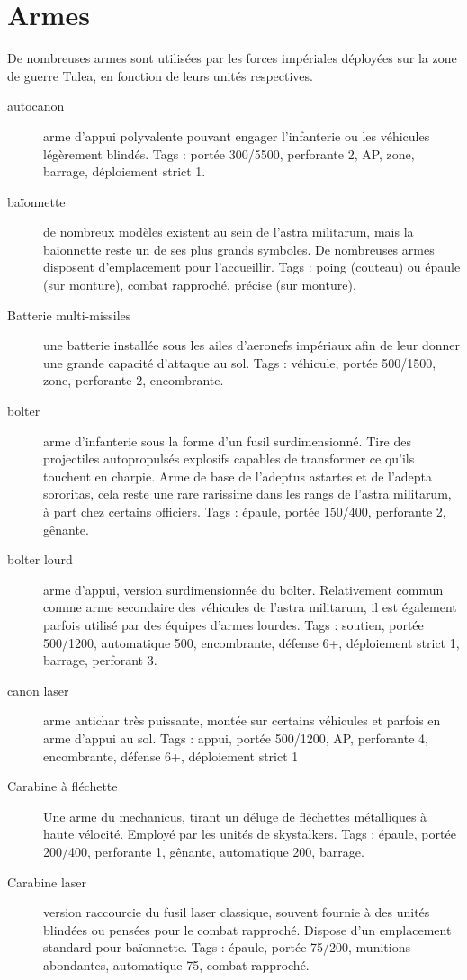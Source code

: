 \documentclass[10pt,a4paper]{article}
\begin{document}
\section{Armes}
De nombreuses armes sont utilisées par les forces impériales déployées sur la zone de guerre Tulea, en fonction de leurs unités respectives.
\begin{description}
\item[autocanon]arme d'appui polyvalente pouvant engager l'infanterie ou les véhicules légèrement blindés. Tags : portée 300/5500, perforante 2, AP, zone, barrage, déploiement strict 1.
\item[baïonnette]de nombreux modèles existent au sein de l'astra militarum, mais la baïonnette reste un de ses plus grands symboles. De nombreuses armes disposent d'emplacement pour l'accueillir. Tags : poing (couteau) ou épaule (sur monture), combat rapproché, précise (sur monture).
\item[Batterie multi-missiles]une batterie installée sous les ailes d'aeronefs impériaux afin de leur donner une grande capacité d'attaque au sol. Tags : véhicule, portée 500/1500, zone, perforante 2, encombrante.
\item[bolter ]arme d'infanterie sous la forme d'un fusil surdimensionné. Tire des projectiles autopropulsés explosifs capables de transformer ce qu'ils touchent en charpie. Arme de base de l'adeptus astartes et de l'adepta sororitas, cela reste une rare rarissime dans les rangs de l'astra militarum, à part chez certains officiers. Tags : épaule, portée 150/400, perforante 2, gênante.
\item[bolter lourd]arme d'appui, version surdimensionnée du bolter. Relativement commun comme arme secondaire des véhicules de l'astra militarum, il est également parfois utilisé par des équipes d'armes lourdes. Tags : soutien, portée 500/1200, automatique 500, encombrante, défense 6+, déploiement strict 1, barrage, perforant 3.
\item[canon laser]arme antichar très puissante, montée sur certains véhicules et parfois en arme d'appui au sol. Tags : appui, portée 500/1200, AP, perforante 4, encombrante, défense 6+, déploiement strict 1
\item[Carabine à fléchette]Une arme du mechanicus, tirant un déluge de fléchettes métalliques à haute vélocité. Employé par les unités de skystalkers. Tags : épaule, portée 200/400, perforante 1, gênante, automatique 200, barrage.
\item[Carabine laser] version raccourcie du fusil laser classique, souvent fournie à des unités blindées ou pensées pour le combat rapproché. Dispose d'un emplacement standard pour baïonnette. Tags : épaule, portée 75/200, munitions abondantes, automatique 75, combat rapproché.

\end{description}
\end{document}
